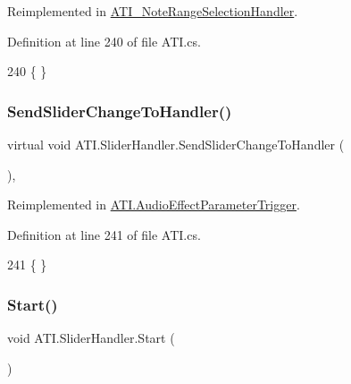 Reimplemented in \hyperlink{class_a_t_i___note_range_selection_handler_a87e90cac12626a0cb547d6e40c6e8260}{A\+T\+I\+\_\+\+Note\+Range\+Selection\+Handler}.



Definition at line 240 of file A\+T\+I.\+cs.


\begin{DoxyCode}
240 \{ \}
\end{DoxyCode}
\mbox{\label{class_a_t_i_1_1_slider_handler_a51fd8e687677af70535a9332ded83d3b}} 
\subsubsection{\texorpdfstring{Send\+Slider\+Change\+To\+Handler()}{SendSliderChangeToHandler()}}
{\footnotesize\ttfamily virtual void A\+T\+I.\+Slider\+Handler.\+Send\+Slider\+Change\+To\+Handler (\begin{DoxyParamCaption}{ }\end{DoxyParamCaption})\hspace{0.3cm}{\ttfamily [protected]}, {\ttfamily [virtual]}}



Reimplemented in \hyperlink{class_a_t_i_1_1_audio_effect_parameter_trigger_ad1dde7a7b8ca7db2766b4941ef826e76}{A\+T\+I.\+Audio\+Effect\+Parameter\+Trigger}.



Definition at line 241 of file A\+T\+I.\+cs.


\begin{DoxyCode}
241 \{ \}
\end{DoxyCode}
\mbox{\label{class_a_t_i_1_1_slider_handler_ad7cd02a45170b1a4af432d1ccc2490ea}} 
\subsubsection{\texorpdfstring{Start()}{Start()}}
{\footnotesize\ttfamily void A\+T\+I.\+Slider\+Handler.\+Start (\begin{DoxyParamCaption}{ }\end{DoxyParamCaption})}



